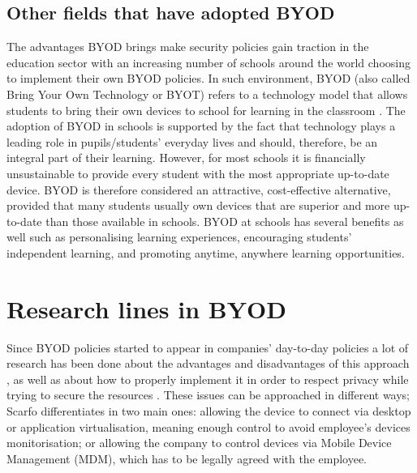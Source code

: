 \subsection{Other fields that have adopted BYOD}
\label{subsec:byodother}

The advantages BYOD brings make security policies gain traction in the education sector with an increasing number of schools around the world choosing to implement their own BYOD policies. In such environment, BYOD (also called Bring Your Own Technology or BYOT) refers to a technology model that allows students to bring their own devices to school for learning in the classroom \cite{sangani2013byod, song2014bring}. The adoption of BYOD in schools is supported by the fact that technology plays a leading role in
pupils/students' everyday lives and should, therefore, be an integral part of their learning. However, for most schools it is financially unsustainable to provide every student with the most appropriate up-to-date device. BYOD is therefore considered an attractive, cost-effective alternative, provided that many students usually own
devices that are superior and more up-to-date than those available in schools. BYOD at schools has several benefits as well such as personalising learning experiences, encouraging students' independent learning, and promoting anytime, anywhere learning opportunities.

\section{Research lines in BYOD}

Since BYOD policies started to appear in companies' day-to-day policies a lot of research has been done about the advantages and disadvantages of this approach \cite{singh2012byod}, as well as about how to properly implement it in order to respect privacy while trying to secure the resources \cite{scarfo2012new, ali2015analysis, de2015corporate}. These issues can be approached in different ways; Scarfo differentiates in \cite{scarfo2012new} two main ones: allowing the device to connect via desktop or application virtualisation, meaning enough control to avoid employee's devices monitorisation; or allowing the company to control devices via Mobile Device Management (MDM), which has to be legally agreed with the employee.

